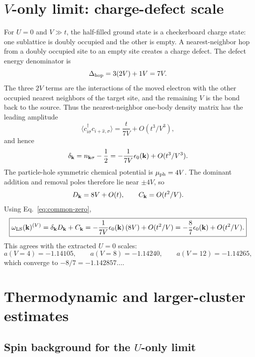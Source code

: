 \documentclass[11pt]{article}
\newcommand{\eps}{\epsilon_0({\bf k})}
\newcommand{\wls}{\omega_{\rm LS}({\bf k})}
\newcommand{\dd}{\delta_{\bf k}}
\newcommand{\Ck}{C_{\bf k}}
\newcommand{\Dk}{D_{\bf k}}
\begin{document}
\section{$V$-only limit: charge-defect scale}

For $U=0$ and $V\gg t$, the half-filled ground state is a checkerboard charge state: one
sublattice is doubly occupied and the other is empty.  A nearest-neighbor hop from a doubly
occupied site to an empty site creates a charge defect.  The defect energy denominator is
\begin{equation}
  \Delta_{\rm hop}=3(2V)+1V=7V.
\end{equation}
The three $2V$ terms are the interactions of the moved electron with the other occupied
nearest neighbors of the target site, and the remaining $V$ is the bond back to the source.
Thus the nearest-neighbor one-body density matrix has the leading amplitude
\begin{equation}
  \langle c^\dagger_{i\sigma}c_{i+\hat x,\sigma}\rangle
  =\frac{t}{7V}+O(t^3/V^3),
\end{equation}
and hence
\begin{equation}
  \dd=n_{{\bf k}\sigma}-\frac12
  =-\frac{1}{7V}\eps+O(t^3/V^3).
  \label{eq:delta-v}
\end{equation}
The particle-hole symmetric chemical potential is $\mu_{\rm ph}=4V$.  The dominant addition
and removal poles therefore lie near $\pm4V$, so
\begin{equation}
  \Dk=8V+O(t),
  \qquad
  \Ck=O(t^2/V).
  \label{eq:gap-v}
\end{equation}
Using Eq.~\eqref{eq:common-zero},
\begin{equation}
  \boxed{
  \wls^{(V)}
  =\dd\Dk+\Ck
  =-\frac{1}{7V}\eps\,(8V)+O(t^2/V)
  =-\frac87\eps+O(t^2/V).
  }
\end{equation}
This agrees with the extracted $U=0$ scales:
\begin{equation}
  a(V=4)=-1.14105,
  \qquad
  a(V=8)=-1.14240,
  \qquad
  a(V=12)=-1.14265,
\end{equation}
which converge to $-8/7=-1.142857\ldots$.

\section{Thermodynamic and larger-cluster estimates}

\subsection{Spin background for the $U$-only limit}
\end{document}
